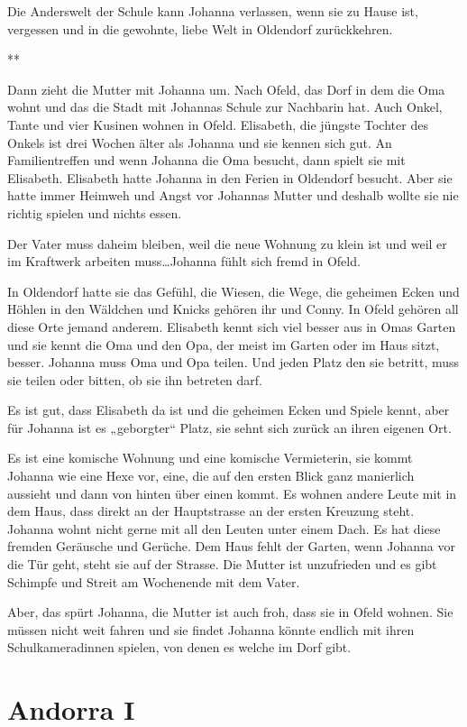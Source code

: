 \documentclass[10pt,a5paper]{book}
\newcommand{\sterne}{\par{\centering ***\par}}
\begin{document}
Die Anderswelt der Schule kann Johanna verlassen, wenn sie zu Hause ist, vergessen und in die gewohnte, liebe Welt in Oldendorf  zurückkehren.


\sterne


Dann zieht die Mutter mit Johanna um. Nach Ofeld, das Dorf in dem die Oma wohnt und das die Stadt mit Johannas Schule zur Nachbarin hat. Auch Onkel, Tante und vier Kusinen wohnen in Ofeld. Elisabeth, die jüngste Tochter des Onkels ist drei Wochen älter als Johanna und sie kennen sich gut. An Familientreffen und wenn Johanna die Oma besucht, dann spielt sie mit Elisabeth. Elisabeth hatte Johanna in den Ferien in Oldendorf besucht. Aber sie hatte immer Heimweh und Angst vor Johannas Mutter und deshalb wollte sie nie richtig spielen und nichts essen.

Der Vater muss daheim bleiben, weil die neue Wohnung zu klein ist und weil er im Kraftwerk arbeiten muss\dots Johanna fühlt sich fremd in Ofeld.

In Oldendorf hatte sie das Gefühl, die Wiesen, die Wege, die geheimen Ecken und Höhlen in den Wäldchen und Knicks gehören ihr und Conny. In Ofeld gehören all diese Orte jemand anderem. Elisabeth kennt sich viel besser aus in Omas Garten und sie kennt die Oma und den Opa, der meist im Garten oder im Haus sitzt, besser. Johanna muss Oma und Opa teilen. Und jeden Platz den sie betritt, muss sie teilen oder bitten, ob sie ihn betreten darf.

Es ist gut, dass Elisabeth da ist und die geheimen Ecken und Spiele kennt, aber für Johanna ist es „geborgter“ Platz, sie sehnt sich zurück an ihren eigenen Ort.

Es ist eine komische Wohnung und eine komische Vermieterin, sie kommt Johanna wie eine Hexe vor, eine, die auf den ersten Blick ganz manierlich aussieht und dann von hinten über einen kommt. Es wohnen andere Leute mit in dem Haus, dass direkt an der Hauptstrasse an der ersten Kreuzung steht. Johanna wohnt nicht gerne mit all den Leuten unter einem Dach. Es hat diese fremden Geräusche und Gerüche. Dem Haus fehlt der Garten, wenn Johanna vor die Tür geht, steht sie auf der Strasse. Die Mutter ist unzufrieden und es gibt Schimpfe und Streit am Wochenende mit dem Vater. 

Aber, das spürt Johanna, die Mutter ist auch froh, dass sie in Ofeld wohnen. Sie müssen nicht weit fahren und sie findet Johanna könnte endlich mit ihren Schulkameradinnen spielen, von denen es welche im Dorf gibt. 


\section*{Andorra I}
\end{document}
